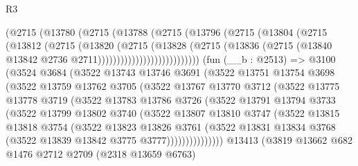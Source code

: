 \begin{lexlean}{R3}
\begin{coremodule}
                      (@2715
                        (@13780
                          (@2715
                            (@13788
                              (@2715
                                (@13796
                                  (@2715
                                    (@13804
                                      (@2715
                                        (@13812
                                          (@2715
                                            (@13820
                                              (@2715
                                                (@13828
                                                  (@2715
                                                    (@13836
                                                      (@2715
                                                        (@13840
                                                          @13842
                                                          @2736
                                                          @2711)))))))))))))))))))))))))))
    (fun (__b : @2513) =>
    @3100
      (@3524
        @3684
        (@3522
          @13743
          @13746
          @3691
          (@3522
            @13751
            @13754
            @3698
            (@3522
              @13759
              @13762
              @3705
              (@3522
                @13767
                @13770
                @3712
                (@3522
                  @13775
                  @13778
                  @3719
                  (@3522
                    @13783
                    @13786
                    @3726
                    (@3522
                      @13791
                      @13794
                      @3733
                      (@3522
                        @13799
                        @13802
                        @3740
                        (@3522
                          @13807
                          @13810
                          @3747
                          (@3522
                            @13815
                            @13818
                            @3754
                            (@3522
                              @13823
                              @13826
                              @3761
                              (@3522
                                @13831
                                @13834
                                @3768
                                (@3522 @13839 @13842 @3775 @3777)))))))))))))))
    @13413
    (@3819
      @13662
      @682
      @1476
      @2712
      @2709
      (@2318 @13659 @6763)

\end{coremodule}
\end{lexlean}

